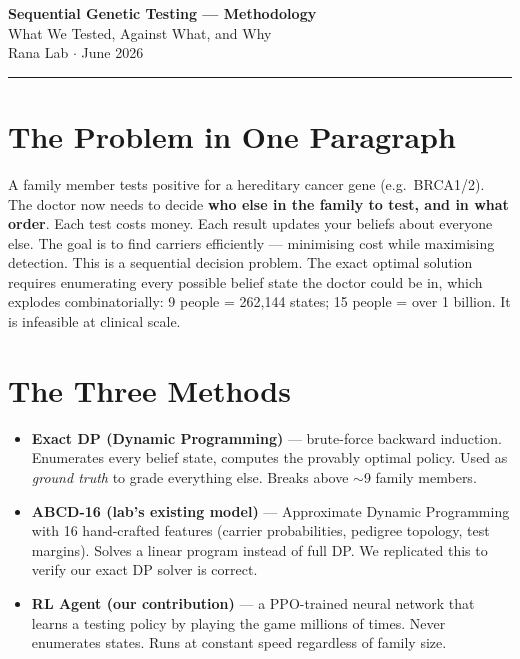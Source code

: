 \documentclass[11pt, a4paper]{article}
\begin{document}
\begin{center}
  {\LARGE \textbf{Sequential Genetic Testing — Methodology}}\\[0.4em]
  {\large What We Tested, Against What, and Why}\\[0.2em]
  {\small Rana Lab $\cdot$ June 2026}
\end{center}

\vspace{0.5em}
\hrule
\vspace{1em}

\section{The Problem in One Paragraph}

A family member tests positive for a hereditary cancer gene (e.g.\ BRCA1/2).
The doctor now needs to decide \textbf{who else in the family to test, and in what order}.
Each test costs money. Each result updates your beliefs about everyone else.
The goal is to find carriers efficiently — minimising cost while maximising detection.
This is a sequential decision problem. The exact optimal solution requires enumerating
every possible belief state the doctor could be in, which explodes combinatorially:
9 people = 262,144 states; 15 people = over 1 billion. It is infeasible at clinical scale.

\section{The Three Methods}

\begin{itemize}
  \item \textbf{Exact DP (Dynamic Programming)} — brute-force backward induction.
        Enumerates every belief state, computes the provably optimal policy.
        Used as \emph{ground truth} to grade everything else.
        Breaks above $\sim$9 family members.

  \item \textbf{ABCD-16 (lab's existing model)} — Approximate Dynamic Programming
        with 16 hand-crafted features (carrier probabilities, pedigree topology,
        test margins). Solves a linear program instead of full DP.
        We replicated this to verify our exact DP solver is correct.

  \item \textbf{RL Agent (our contribution)} — a PPO-trained neural network
        that learns a testing policy by playing the game millions of times.
        Never enumerates states. Runs at constant speed regardless of family size.
\end{itemize}
\end{document}
